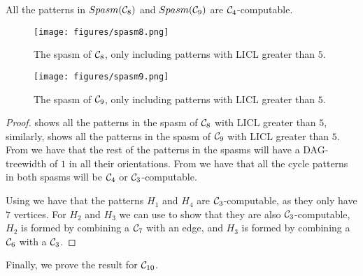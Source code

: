 \documentclass[a4paper,UKenglish,cleveref, autoref, numberwithinsect, thm-restate]{lipics-v2021}
\newcommand{\computable}[1]{${#1}$-computable}
\newcommand{\cycle}[1]{\cC_{#1}}
\newcommand{\LICL}{LICL}
\newcommand{\Spasm}{Spasm}
\newcommand{\dagtreewidth}{DAG-treewidth}
\newcommand{\cC}{{\cal C}}
\begin{document}
	\begin{lemma}
		All the patterns in $\Spasm(\cycle{8})$ and $\Spasm(\cycle{9})$ are \computable{\cycle{4}}.
	\end{lemma}
	
	\begin{figure}
		\centering
		\texttt{[image: figures/spasm8.png]}\caption{The spasm of $\cycle{8}$, only including patterns with \LICL{} greater than $5$.}
		\label{fig:spasm8}
	\end{figure}
	
	\begin{figure}
		\centering
		\texttt{[image: figures/spasm9.png]}\caption{The spasm of $\cycle{9}$, only including patterns with \LICL{} greater than $5$.}
		\label{fig:spasm9}
	\end{figure}
	
	\begin{proof}
		 shows all the patterns in the spasm of $\cycle{8}$ with \LICL{} greater than $5$, similarly,  shows all the patterns in the spasm of $\cycle{9}$ with \LICL{} greater than $5$. From  we have that the rest of the patterns in the spasms will have a \dagtreewidth{} of $1$ in all their orientations. From  we have that all the cycle patterns in both spasms will be $\cycle{4}$ or \computable{\cycle{3}}.
		
		Using  we have that the patterns $H_1$ and $H_4$ are \computable{\cycle{3}}, as they only have $7$ vertices. For $H_2$ and $H_3$ we can use  to show that they are also \computable{\cycle{3}}, $H_2$ is formed by combining a $\cycle{7}$ with an edge, and $H_3$ is formed by combining a $\cycle{6}$ with a $\cycle{3}$.
	\end{proof}
	
	Finally, we prove the result for $\cycle{10}$.
	
\end{document}
